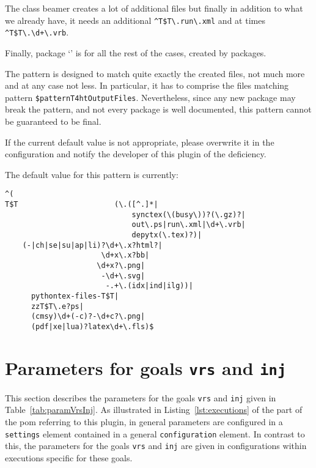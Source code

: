 The class beamer creates a lot of additional files 
but finally in addition to what we already have, 
it needs an additional \texttt{\^{}T\$T\textbackslash.run\textbackslash.xml} 
and at times \texttt{\^{}T\$T\textbackslash.\textbackslash d+\textbackslash.vrb}. 

Finally, package `' is for all the rest of the cases, created by packages. 


The pattern is designed 
to match quite exactly the created files, 
not much more and at any case not less. 
In particular, it has to comprise the files matching pattern 
\texttt{\$patternT4htOutputFiles}. 
Nevertheless, since any new package may break the pattern, 
and not every package is well documented, 
this pattern cannot be guaranteed to be final. 

If the current default value is not appropriate, 
please overwrite it in the configuration 
and notify the developer of this plugin of the deficiency. 

The default value for this pattern is currently: 
%
\begin{verbatim}
^(
T$T                      (\.([^.]*|
                             synctex(\(busy\))?(\.gz)?|
                             out\.ps|run\.xml|\d+\.vrb|
                             depytx(\.tex)?)|
    (-|ch|se|su|ap|li)?\d+\.x?html?|
                      \d+x\.x?bb|
                     \d+x?\.png|
                      -\d+\.svg|
                       -.+\.(idx|ind|ilg))|
      pythontex-files-T$T|
      zzT$T\.e?ps|
      (cmsy)\d+(-c)?-\d+c?\.png|
      (pdf|xe|lua)?latex\d+\.fls)$
\end{verbatim}

\section{Parameters for goals \texttt{vrs} and \texttt{inj} }\label{sec:settingsGoalVrsInj}
 
This section describes the parameters for the goals \texttt{vrs} and \texttt{inj} 
given in Table~\ref{tab:paramVrsInj}. 
As illustrated in Listing~\ref{lst:executions} of the part of the pom 
referring to this plugin, 
in general parameters are configured in a \texttt{settings} element 
contained in a general \texttt{configuration} element. 
In contrast to this, the parameters for the goals \texttt{vrs} and \texttt{inj} 
are given in configurations within executions specific for these goals. 

